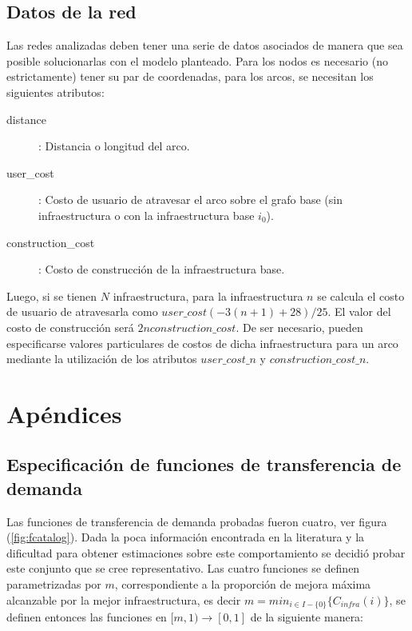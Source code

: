 \documentclass{article}
\begin{document}
  \subsection*{Datos de la red}

  Las redes analizadas deben tener una serie de datos asociados de manera que sea posible solucionarlas con el modelo planteado. Para los nodos es necesario (no estrictamente) tener su par de coordenadas, para los arcos, se necesitan los siguientes atributos:

  \begin{description}
    \item[distance]: Distancia o longitud del arco.
    \item[user\_cost]: Costo de usuario de atravesar el arco sobre el grafo base (sin infraestructura o con la infraestructura base $i_0$).
    \item[construction\_cost]: Costo de construcción de la infraestructura base.
  \end{description}

  Luego, si se tienen $N$ infraestructura, para la infraestructura $n$ se calcula el costo de usuario de atravesarla como $user\_cost (-3 (n + 1) + 28) / 25$. El valor del costo de construcción será $2 n construction\_cost$. De ser necesario, pueden especificarse valores particulares de costos de dicha infraestructura para un arco mediante la utilización de los atributos $user\_cost\_n$ y $construction\_cost\_n$.

  \section*{Apéndices}

  \subsection*{Especificación de funciones de transferencia de demanda}

  Las funciones de transferencia de demanda probadas fueron cuatro, ver figura (\ref{fig:fcatalog}). Dada la poca información encontrada en la literatura y la dificultad para obtener estimaciones sobre este comportamiento se decidió probar este conjunto que se cree representativo. Las cuatro funciones se definen parametrizadas por $m$, correspondiente a la proporción de mejora máxima alcanzable por la mejor infraestructura, es decir $m = min_{i \in I - \{0\}} \{ C_{infra}(i) \}$, se definen entonces las funciones en $[m, 1) \rightarrow [0, 1]$ de la siguiente manera:
\end{document}
